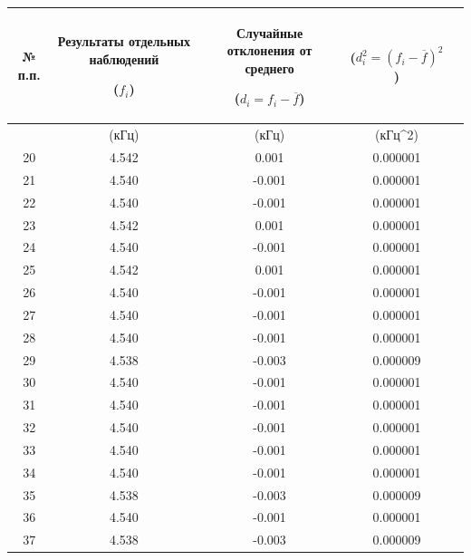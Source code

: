\begin{center}
\begin{tabular}{|c|c|c|c|c|}
\hline
\begin{minipage}{7mm}
    № п.п. 
\end{minipage}&
\begin{minipage}{5cm}
\begin{center}
    Результаты отдельных наблюдений 
    
    ($f_i$)
\end{center}
\end{minipage} &
\begin{minipage}{5cm}
\begin{center}
    Случайные отклонения от среднего
    
    ($d_i = f_i - \overline{f}$)
\end{center}
\end{minipage} &
\begin{minipage}{5cm}
\begin{center}
    ($d_i^2 = (f_i - \overline{f})^2$)
\end{center}
\end{minipage}\\
\hline
{}&(кГц)&(кГц)&(кГц^2)\\
\hline
20 &	4.542  &  0.001 & 0.000001 \\
21 &	4.540  &  -0.001 & 0.000001 \\
22 &	4.540  &  -0.001 & 0.000001 \\
23 &	4.542  &  0.001 & 0.000001 \\
24 &	4.540  &  -0.001 & 0.000001 \\
25 &	4.542  &  0.001 & 0.000001 \\
26 &	4.540  &  -0.001 & 0.000001 \\
27 &	4.540  &  -0.001 & 0.000001 \\
28 &	4.540  &  -0.001 & 0.000001 \\
29 &	4.538  &  -0.003 & 0.000009 \\
30 &	4.540  &  -0.001 & 0.000001 \\
31 &	4.540  &  -0.001 & 0.000001 \\
32 &	4.540  &  -0.001 & 0.000001 \\
33 &	4.540  &  -0.001 & 0.000001 \\
34 &	4.540  &  -0.001 & 0.000001 \\
35 &	4.538  &  -0.003 & 0.000009 \\
36 &	4.540  &  -0.001 & 0.000001 \\
37 &	4.538  &  -0.003 & 0.000009 \\

\end{tabular}
\end{center}
